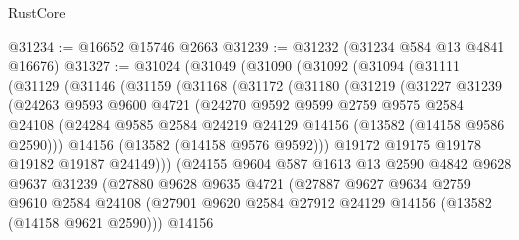 \begin{lexlean}{RustCore}
\begin{coremodule}
@31234 := @16652 @15746 @2663
@31239 := @31232 (@31234 @584 @13 @4841 @16676)
@31327 := @31024
    (@31049
      (@31090
        (@31092
          (@31094
            (@31111
              (@31129
                (@31146
                  (@31159
                    (@31168
                      (@31172
                        (@31180
                          (@31219
                            (@31227
                              @31239
                              (@24263
                                @9593
                                @9600
                                @4721
                                (@24270
                                  @9592
                                  @9599
                                  @2759
                                  @9575
                                  @2584
                                  @24108
                                  (@24284
                                    @9585
                                    @2584
                                    @24219
                                    @24129
                                    @14156
                                    (@13582 (@14158 @9586 @2590)))
                                  @14156
                                  (@13582 (@14158 @9576 @9592)))
                                @19172
                                @19175
                                @19178
                                @19182
                                @19187
                                @24149)))
                          (@24155
                            @9604
                            @587
                            @1613
                            @13
                            @2590
                            @4842
                            @9628
                            @9637
                            @31239
                            (@27880
                              @9628
                              @9635
                              @4721
                              (@27887
                                @9627
                                @9634
                                @2759
                                @9610
                                @2584
                                @24108
                                (@27901
                                  @9620
                                  @2584
                                  @27912
                                  @24129
                                  @14156
                                  (@13582 (@14158 @9621 @2590)))
                                @14156

\end{coremodule}
\end{lexlean}
